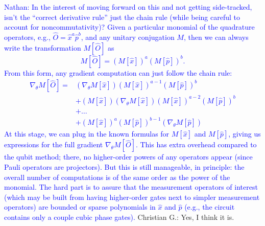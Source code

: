 \documentclass[aps,pra,10pt,onecolumn,notitlepage, groupedaddress,nofootinbib]{revtex4-1}
\theoremstyle{plain}
\newcommand{\nathan}[1]{\textcolor{blue}{Nathan: #1}}
\newcommand{\cg}[1]{\textcolor{cyan!80!black}{Christian G.: #1}}
\begin{document}
\nathan{In the interest of moving forward on this and not getting side-tracked, isn't the ``correct derivative rule'' just the chain rule (while being careful to account for noncommutativity)? Given a particular monomial of the quadrature operators, e.g., $\hat{O}=\hat{x}^a\hat{p}^b$, and any unitary conjugation $M$, then we can always write the transformation $M[\hat{O}]$ as
\begin{equation}
 M[\hat{O}] = \left(M[\hat{x}]\right)^a \left(M[\hat{p}]\right)^b.
\end{equation}
From this form, any gradient computation can just follow the chain rule:
\begin{align*}
 \nabla_\theta M[\hat{O}]
 = &\left(\nabla_\theta M[\hat{x}]\right) \left(M[\hat{x}]\right)^{a-1}\left(M[\hat{p}]\right)^b \\
   & + \left(M[\hat{x}]\right)\left(\nabla_\theta M[\hat{x}]\right)\left(M[\hat{x}]\right)^{a-2} \left(M[\hat{p}]\right)^b \\
   & + \dots \\
   & +  \left(M[\hat{x}]\right)^a \left(M[\hat{p}]\right)^{b-1}\left(\nabla_\theta M[\hat{p}]\right)
\end{align*}
At this stage, we can plug in the known formulas for $M[\hat{x}]$ and $M[\hat{p}]$, giving us expressions for the full gradient $\nabla_\theta M[\hat{O}]$. This has extra overhead compared to the qubit method; there, no higher-order powers of any operators appear (since Pauli operators are projectors). But this is still manageable, in principle: the overall number of computations is of the same order as the power of the monomial. The hard part is to assure that the measurement operators of interest (which may be built from having higher-order gates next to simpler measurement operators) are bounded or sparse polynomials in $\hat{x}$ and $\hat{p}$ (e.g., the circuit contains only a couple cubic phase gates).
}
\cg{Yes, I think it is.}
\end{document}
